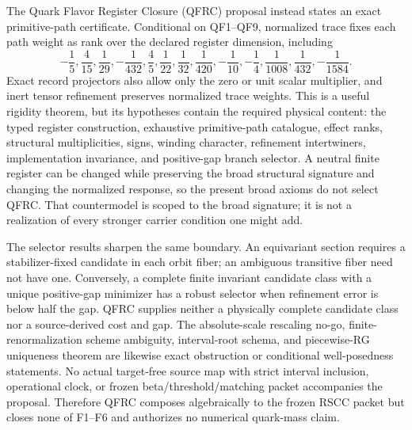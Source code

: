\documentclass[11pt]{article}
\begin{document}
The Quark Flavor Register Closure (QFRC) proposal instead states an exact primitive-path
certificate.  Conditional on QF1--QF9, normalized trace fixes each path weight as rank over the
declared register dimension, including
\[
-\frac15,\frac4{15},\frac1{29},-\frac1{432},\frac45,\frac1{22},
\frac1{32},\frac1{420},-\frac1{10},-\frac14,
\frac1{1008},\frac1{432},-\frac1{1584}.
\]
Exact record projectors also allow only the zero or unit scalar multiplier, and inert tensor
refinement preserves normalized trace weights.  This is a useful rigidity theorem, but its
hypotheses contain the required physical content: the typed register construction, exhaustive
primitive-path catalogue, effect ranks, structural multiplicities, signs, winding character,
refinement intertwiners, implementation invariance, and positive-gap branch selector.  A neutral
finite register can be changed while preserving the broad structural signature and changing the
normalized response, so the present broad axioms do not select QFRC.  That countermodel is scoped
to the broad signature; it is not a realization of every stronger carrier condition one might add.

The selector results sharpen the same boundary.  An equivariant section requires a
stabilizer-fixed candidate in each orbit fiber; an ambiguous transitive fiber need not have one.
Conversely, a complete finite invariant candidate class with a unique positive-gap minimizer has a
robust selector when refinement error is below half the gap.  QFRC supplies neither a physically
complete candidate class nor a source-derived cost and gap.  The absolute-scale rescaling no-go,
finite-renormalization scheme ambiguity, interval-root schema, and piecewise-RG uniqueness theorem
are likewise exact obstruction or conditional well-posedness statements.  No actual target-free
source map with strict interval inclusion, operational clock, or frozen beta/threshold/matching
packet accompanies the proposal.  Therefore QFRC composes algebraically to the frozen RSCC packet
but closes none of F1--F6 and authorizes no numerical quark-mass claim.
\end{document}
